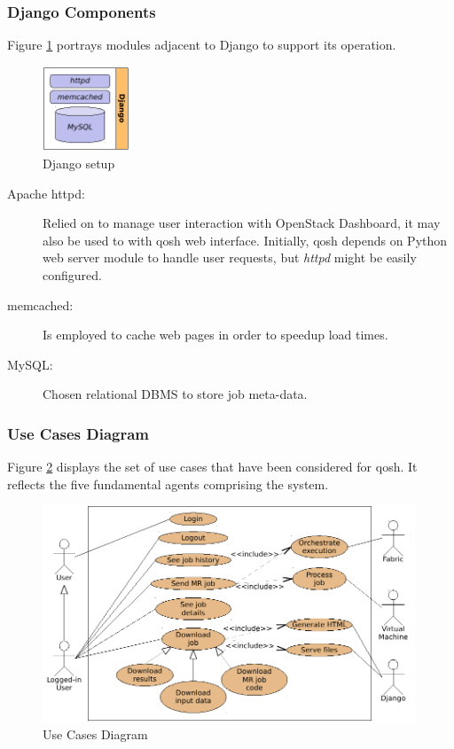 \subsubsection{Django Components}\label{subsubsec:componentesdjango}
\noindent Figure \ref{fig:instalaciondjango} portrays modules adjacent to Django to support its operation.

\begin{figure}[bp]
\begin{center}
\includegraphics[width=0.23\textwidth]{imagenes/024.pdf}
 \caption{Django setup}
\label{fig:instalaciondjango}
\end{center}
\end{figure}

\begin{description}
 \item[Apache httpd:] Relied on to manage user interaction with OpenStack Dashboard, it may also be used to with qosh web interface. Initially, qosh depends on Python web server module to handle user requests, but \emph{httpd} might be easily configured.
 \item[memcached:] Is employed to cache web pages in order to speedup load times.
 \item[MySQL:] Chosen relational DBMS to store job meta-data.
\end{description}


\subsubsection{Use Cases Diagram}\label{subsubsec:casosuso}
\noindent Figure \ref{fig:casosuso} displays the set of use cases that have been considered for qosh. It reflects the five fundamental agents comprising the system.

\begin{figure}[tbp]
\begin{center}
\includegraphics[width=0.99\textwidth]{imagenes/025.pdf}
 \caption{Use Cases Diagram}
\label{fig:casosuso}
\end{center}
\end{figure}

